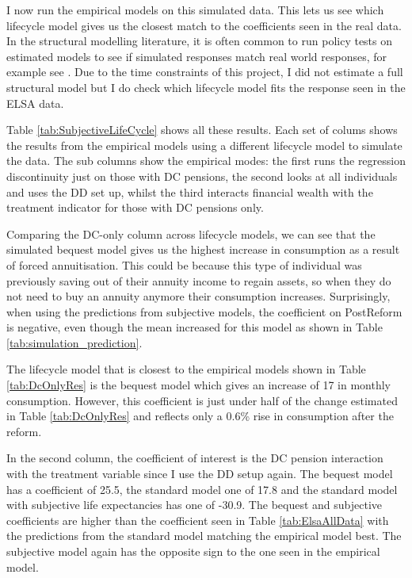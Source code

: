 \documentclass[12pt]{article}
\begin{document}
I now run the empirical models on this simulated data. This lets us see which
lifecycle model gives us the closest match to the coefficients seen in the real
data. In the structural modelling literature, it is often common to run policy
tests on estimated models to see if simulated responses match real world
responses, for example see \cite{mcgee_2021}. Due to the time constraints of
this project, I did not estimate a full structural model but I do check which
lifecycle model fits the response seen in the ELSA data.




\begin{landscape}
    \linespread{1.5}

    
\end{landscape}


Table \ref{tab:SubjectiveLifeCycle} shows all these results. Each set of colums shows the
results from the empirical models using a different lifecycle model to simulate
the data. The sub columns show the empirical modes: the first runs the
regression discontinuity just on those with DC pensions, the second looks at
all individuals and uses the DD set up, whilst the third interacts financial
wealth with the treatment indicator for those with DC pensions only.

Comparing the DC-only column across lifecycle models, we can see that the
simulated bequest model gives us the highest increase in consumption as a result
of forced annuitisation. This could be because this type of individual was
previously saving out of their annuity income to regain assets, so when they do
not need to buy an annuity anymore their consumption increases. Surprisingly,
when using the predictions from subjective models, the coefficient on PostReform
is negative, even though the mean increased for this model as shown in Table
\ref{tab:simulation_prediction}.

The lifecycle model that is closest to the empirical models shown in Table
\ref{tab:DcOnlyRes} is the bequest model which gives an increase of 17 in
monthly consumption. However, this coefficient is just under half of the change
estimated in Table \ref{tab:DcOnlyRes} and reflects only a 0.6\% rise in
consumption after the reform.

In the second column, the coefficient of interest is the DC pension interaction
with the treatment variable since I use the DD setup again. The bequest model
has a coefficient of 25.5, the standard model one of 17.8 and the standard model
with subjective life expectancies has one of -30.9. The bequest and subjective
coefficients are higher than the coefficient seen in Table \ref{tab:ElsaAllData}
with the predictions from the standard model matching the empirical model best.
The subjective model again has the opposite sign to the one seen in the
empirical model.
\end{document}
